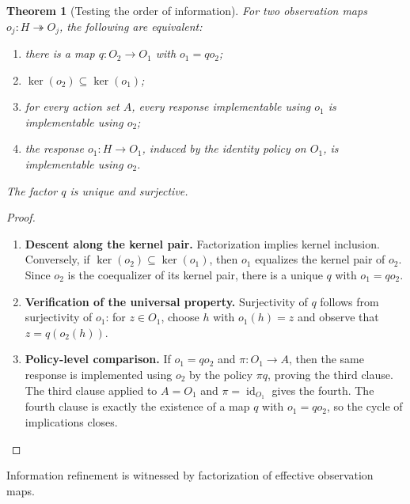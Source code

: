 \documentclass[11pt,a4paper]{article}
\numberwithin{equation}{section}
\newtheorem{theorem}{Theorem}[section]
\theoremstyle{definition}
\theoremstyle{remark}
\theoremstyle{plain}
\begin{document}
\begin{theorem}[Testing the order of information]
\label{thm:egt-information-order}
For two observation maps $o_j:H\twoheadrightarrow O_j$, the following are
equivalent:
\begin{enumerate}[label=\textup{(\roman*)},leftmargin=*]
\item there is a map $q:O_2\to O_1$ with $o_1=qo_2$;
\item $\operatorname{ker}(o_2)\subseteq\operatorname{ker}(o_1)$;
\item for every action set $A$, every response implementable using $o_1$ is
      implementable using $o_2$;
\item the response $o_1:H\to O_1$, induced by the identity policy on $O_1$,
      is implementable using $o_2$.
\end{enumerate}
The factor $q$ is unique and surjective.
\end{theorem}
\begin{proof}
\leavevmode
\begin{enumerate}[label=\textup{(\arabic*)},leftmargin=*,itemsep=4pt,topsep=3pt]
  \item \textbf{Descent along the kernel pair.} Factorization implies kernel inclusion. Conversely, if
$\operatorname{ker}(o_2)\subseteq\operatorname{ker}(o_1)$, then $o_1$
equalizes the kernel pair of $o_2$. Since $o_2$ is the coequalizer of its
kernel pair, there is a unique $q$ with $o_1=qo_2$.
  \item \textbf{Verification of the universal property.} Surjectivity of $q$
follows from surjectivity of $o_1$: for $z\in O_1$, choose $h$ with
$o_1(h)=z$ and observe that $z=q(o_2(h))$.
  \item \textbf{Policy-level comparison.} If $o_1=qo_2$ and $\pi:O_1\to A$, then the same response is implemented
using $o_2$ by the policy $\pi q$, proving the third clause. The third
clause applied to $A=O_1$ and $\pi=\operatorname{id}_{O_1}$ gives the
fourth. The fourth clause is exactly the existence of a map $q$ with
$o_1=qo_2$, so the cycle of implications closes.
\end{enumerate}
\end{proof}

\noindent Information refinement is witnessed by factorization of effective observation maps.
\begin{center}
\end{center}
\end{document}
